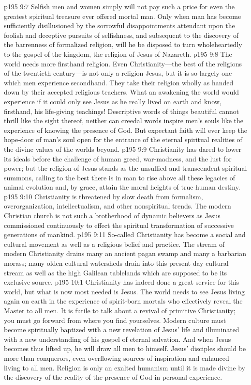 \vs p195 9:7 Selfish men and women simply will not pay such a price for even the greatest spiritual treasure ever offered mortal man. Only when man has become sufficiently disillusioned by the sorrowful disappointments attendant upon the foolish and deceptive pursuits of selfishness, and subsequent to the discovery of the barrenness of formalized religion, will he be disposed to turn wholeheartedly to the gospel of the kingdom, the religion of Jesus of Nazareth.
\vs p195 9:8 The world needs more firsthand religion. Even Christianity---the best of the religions of the twentieth century---is not only a religion  Jesus, but it is so largely one which men experience secondhand. They take their religion wholly as handed down by their accepted religious teachers. What an awakening the world would experience if it could only see Jesus as he really lived on earth and know, firsthand, his life\hyp{}giving teachings! Descriptive words of things beautiful cannot thrill like the sight thereof, neither can creedal words inspire men’s souls like the experience of knowing the presence of God. But expectant faith will ever keep the hope\hyp{}door of man’s soul open for the entrance of the eternal spiritual realities of the divine values of the worlds beyond.
\pc \vs p195 9:9 Christianity has dared to lower its ideals before the challenge of human greed, war\hyp{}madness, and the lust for power; but the religion of Jesus stands as the unsullied and transcendent spiritual summons, calling to the best there is in man to rise above all these legacies of animal evolution and, by grace, attain the moral heights of true human destiny.
\vs p195 9:10 Christianity is threatened by slow death from formalism, overorganization, intellectualism, and other nonspiritual trends. The modern Christian church is not such a brotherhood of dynamic believers as Jesus commissioned continuously to effect the spiritual transformation of successive generations of mankind.
\vs p195 9:11 So\hyp{}called Christianity has become a social and cultural movement as well as a religious belief and practice. The stream of modern Christianity drains many an ancient pagan swamp and many a barbarian morass; many olden cultural watersheds drain into this present\hyp{}day cultural stream as well as the high Galilean tablelands which are supposed to be its exclusive source.
\vs p195 10:1 Christianity has indeed done a great service for this world, but what is now most needed is Jesus. The world needs to see Jesus living again on earth in the experience of spirit\hyp{}born mortals who effectively reveal the Master to all men. It is futile to talk about a revival of primitive Christianity; you must go forward from where you find yourselves. Modern culture must become spiritually baptized with a new revelation of Jesus’ life and illuminated with a new understanding of his gospel of eternal salvation. And when Jesus becomes thus lifted up, he will draw all men to himself. Jesus’ disciples should be more than conquerors, even overflowing sources of inspiration and enhanced living to all men. Religion is only an exalted humanism until it is made divine by the discovery of the reality of the presence of God in personal experience.
